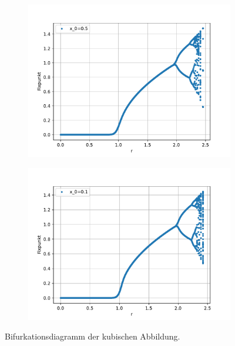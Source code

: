 \begin{itemize}
\begin{itemize}
        \begin{figure}
            \begin{subfigure}{.6\textwidth}
                \centering
                \includegraphics[width=.9\linewidth]{images/Bif_kub2.pdf}
            \end{subfigure}
            \begin{subfigure}{.6\textwidth}
                \centering
                \includegraphics[width=.9\linewidth]{images/Bif_kub0.pdf}
                \end{subfigure}
            \caption{Bifurkationsdiagramm der kubischen Abbildung. }

        \end{figure}
    \end{itemize}

\end{itemize}


